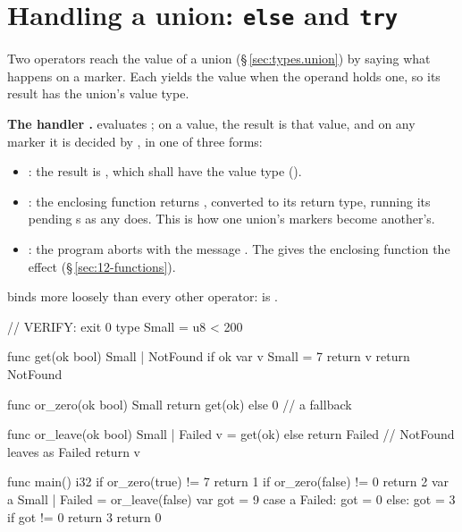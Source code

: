 \section{Handling a union: \texttt{else} and \texttt{try}}
\label{sec:expr.handle}

\pnum
Two operators reach the value of a union (\S\,\ref{sec:types.union}) by saying what happens on a
marker.  Each yields the value when the operand holds one, so its result has the union's value
type.

\pnum
\textbf{The handler .}   evaluates ; on a value, the result is
that value, and on any marker it is decided by , in one of three forms:
\begin{itemize}
  \item {}: the result is , which shall have the value type
        ().
  \item {}: the enclosing function returns , converted to its
        return type, running its pending s as any  does.  This is how
        one union's markers become another's.
  \item {}: the program aborts with the message .  The 
        gives the enclosing function the  effect (\S\,\ref{sec:12-functions}).
\end{itemize}
 binds more loosely than every other operator:  is
.

\begin{laincode}
// VERIFY: exit 0
type Small = u8 < 200

func get(ok bool) Small | NotFound {
    if ok {
        var v Small = 7
        return v
    }
    return NotFound
}

func or_zero(ok bool) Small {
    return get(ok) else 0                  // a fallback
}

func or_leave(ok bool) Small | Failed {
    v = get(ok) else return Failed         // NotFound leaves as Failed
    return v
}

func main() i32 {
    if or_zero(true) != 7 { return 1 }
    if or_zero(false) != 0 { return 2 }
    var a Small | Failed = or_leave(false)
    var got = 9
    case a {
        Failed: got = 0
        else: got = 3
    }
    if got != 0 { return 3 }
    return 0
}
\end{laincode}

